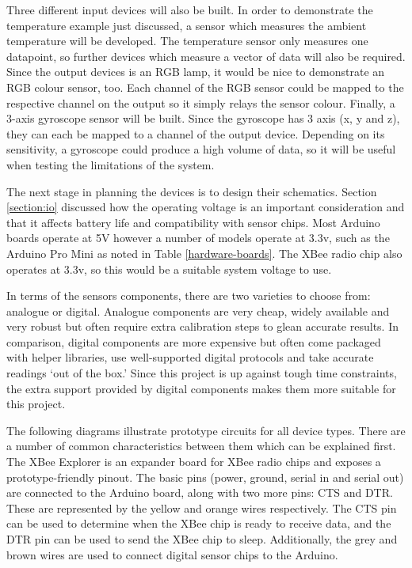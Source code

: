         Three different input devices will also be built. In order to demonstrate the temperature example just discussed, a sensor which measures the ambient temperature will be developed. The temperature sensor only measures one datapoint, so further devices which measure a vector of data will also be required. Since the output devices is an RGB lamp, it would be nice to demonstrate an RGB colour sensor, too. Each channel of the RGB sensor could be mapped to the respective channel on the output so it simply relays the sensor colour. Finally, a 3-axis gyroscope sensor will be built. Since the gyroscope has 3 axis (x, y and z), they can each be mapped to a channel of the output device. Depending on its sensitivity, a gyroscope could produce a high volume of data, so it will be useful when testing the limitations of the system.

        The next stage in planning the devices is to design their schematics. Section \ref{section:io} discussed how the operating voltage is an important consideration and that it affects battery life and compatibility with sensor chips. Most Arduino boards operate at 5V however a number of models operate at 3.3v, such as the Arduino Pro Mini as noted in Table \ref{hardware-boards}. The XBee radio chip also operates at 3.3v, so this would be a suitable system voltage to use.

        In terms of the sensors components, there are two varieties to choose from: analogue or digital. Analogue components are very cheap, widely available and very robust but often require extra calibration steps to glean accurate results. In comparison, digital components are more expensive but often come packaged with helper libraries, use well-supported digital protocols and take accurate readings `out of the box.' Since this project is up against tough time constraints, the extra support provided by digital components makes them more suitable for this project.

        The following diagrams illustrate prototype circuits for all device types. There are a number of common characteristics between them which can be explained first. The XBee Explorer is an expander board for XBee radio chips and exposes a prototype-friendly pinout. The basic pins (power, ground, serial in and serial out) are connected to the Arduino board, along with two more pins: CTS and DTR. These are represented by the yellow and orange wires respectively. The CTS pin can be used to determine when the XBee chip is ready to receive data, and the DTR pin can be used to send the XBee chip to sleep. Additionally, the grey and brown wires are used to connect digital sensor chips to the Arduino.

